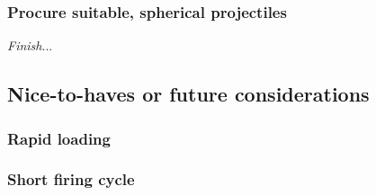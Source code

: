 \documentclass{article}
\begin{document}
\subsubsection{Procure suitable, spherical projectiles}
{\it Finish}...

\subsection{Nice-to-haves or future considerations}

\subsubsection{Rapid loading}

\subsubsection{Short firing cycle}
\end{document}
